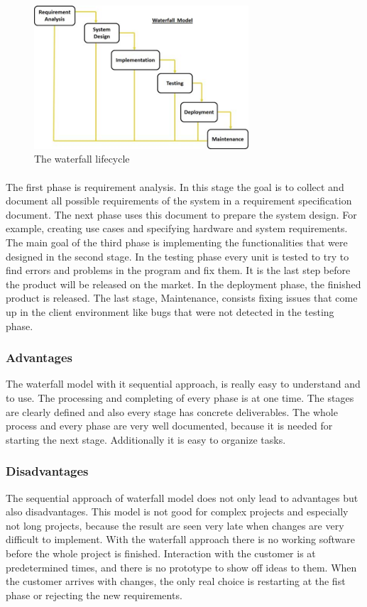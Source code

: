 \begin{figure}[ht!]
  \centering
  \includegraphics[width=80mm]{./PreliminaryStudies/img/waterfall}
  \caption{The waterfall lifecycle}
  \label{fig:PrelimMethodWaterfall}
\end{figure}

\paragraph{}The first phase is requirement analysis. In this stage the goal is to collect and document all possible requirements of the system in a requirement specification document. The next phase uses this document to prepare the system design. For example, creating use cases and specifying hardware and system requirements. The main goal of the third phase is implementing the functionalities that were designed in the second stage. In the testing phase every unit is tested to try to find errors and problems in the program and fix them. It is the last step before the product will be released on the market. In the deployment phase, the finished product is released. The last stage, Maintenance, consists fixing issues that come up in the client environment like bugs that were not detected in the testing phase.

\subsubsection{Advantages}
The waterfall model with it sequential approach, is really easy to understand and to use. The processing and completing of every phase is at one time. The stages are clearly defined and also every stage has concrete deliverables. The whole process and every phase are very well documented, because it is needed for starting the next stage. Additionally it is easy to organize tasks.

\subsubsection{Disadvantages}
The sequential approach of waterfall model does not only lead to advantages but also disadvantages. This model is not good for complex projects and especially not long projects, because the result are seen very late when changes are very difficult to implement. With the waterfall approach there is no working software before the whole project is finished.  Interaction with the customer is at predetermined times, and there is no prototype to show off ideas to them. When the customer arrives with changes, the only real choice is restarting at the fist phase or rejecting the new requirements.


